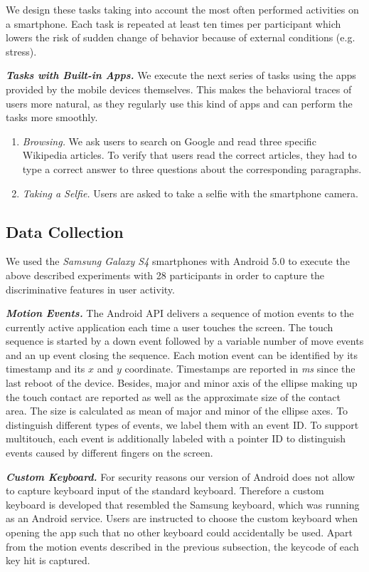\documentclass{llncs}
\begin{document}
We design these tasks taking into account the most often performed activities on a smartphone. Each task is repeated at least ten times per participant which lowers the risk of sudden change of behavior because of external conditions (e.g. stress).

\medskip \noindent \textbf{\emph{Tasks with Built-in Apps.}}
We execute the next series of tasks using the apps provided by the mobile devices themselves. This makes the behavioral traces of users more natural, as they regularly use this kind of apps and can perform the tasks more smoothly.

\begin{enumerate}
%
\item \emph{Browsing.} We ask users to search on Google and read three specific Wikipedia articles. To verify that users read the correct articles, they had to type a correct answer to three questions about the corresponding paragraphs.
%
\item \emph{Taking a Selfie.} Users are asked to take a selfie with the smartphone camera.
%
\end{enumerate}

\subsection{Data Collection}

We used the \textit{Samsung Galaxy S4} smartphones with Android 5.0 to execute the above described experiments with 28 participants in order to capture the discriminative features in user activity.

\medskip \noindent \textbf{\emph{Motion Events.}}
The Android API delivers a sequence of motion events to the currently active application each time a user touches the screen. The touch sequence is started by a down event followed by a variable number of move events and an up event closing the sequence. Each motion event can be identified by its timestamp and its $x$ and $y$ coordinate. Timestamps are reported in \textit{ms} since the last reboot of the device. Besides, major and minor axis of the ellipse making up the touch contact are reported as well as the approximate size of the contact area. The size is calculated as mean of major and minor of the ellipse axes. To distinguish different types of events, we label them with an event ID. To support multitouch, each event is additionally labeled with a pointer ID to distinguish events caused by different fingers on the screen.

\medskip \noindent \textbf{\emph{Custom Keyboard.}}
For security reasons our version of Android does not allow to capture keyboard input of the standard keyboard. Therefore a custom keyboard is developed that resembled the Samsung keyboard, which was running as an Android service. Users are instructed to choose the custom keyboard when opening the app such that no other keyboard could accidentally be used. Apart from the motion events described in the previous subsection, the keycode of each key hit is captured.
\end{document}
